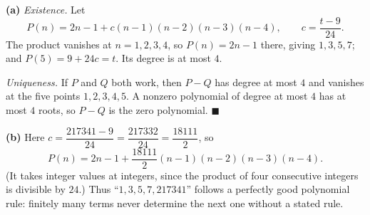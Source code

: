 \textbf{(a)} \emph{Existence.} Let
\[P(n)=2n-1+c(n-1)(n-2)(n-3)(n-4),\qquad c=\dfrac{t-9}{24}.\]
The product vanishes at $n=1,2,3,4$, so $P(n)=2n-1$ there, giving $1,3,5,7$; and $P(5)=9+24c=t$. Its degree is at most $4$.

\emph{Uniqueness.} If $P$ and $Q$ both work, then $P-Q$ has degree at most $4$ and vanishes at the five points $1,2,3,4,5$. A nonzero polynomial of degree at most $4$ has at most $4$ roots, so $P-Q$ is the zero polynomial. $\blacksquare$

\textbf{(b)} Here $c=\dfrac{217341-9}{24}=\dfrac{217332}{24}=\dfrac{18111}{2}$, so
\[\boxed{P(n)=2n-1+\dfrac{18111}{2}(n-1)(n-2)(n-3)(n-4)}.\]
(It takes integer values at integers, since the product of four consecutive integers is divisible by $24$.) Thus ``$1,3,5,7,217341$'' follows a perfectly good polynomial rule: finitely many terms never determine the next one without a stated rule.
